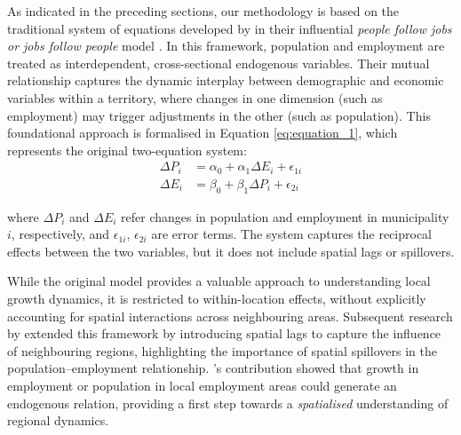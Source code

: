 \documentclass[a4paper,11pt,oneside]{article}
\begin{document}




As indicated in the preceding sections, our methodology is based on the traditional system of equations developed by \citeauthor{carlino1987determinants} in their influential \textit{people follow jobs or jobs follow people} model \citep{carlino1987determinants}. In this framework, population and employment are treated as interdependent, cross-sectional endogenous variables. Their mutual relationship captures the dynamic interplay between demographic and economic variables within a territory, where changes in one dimension (such as employment) may trigger adjustments in the other (such as population). This foundational approach is formalised in Equation \eqref{eq:equation_1}, which represents the original two-equation system:
%
\begin{equation}
\tag{i}
\label{eq:equation_1}
\begin{aligned}
\Delta P_i &= \alpha_0 + \alpha_1 \Delta E_i + \epsilon_{1i} \\
\Delta E_i &= \beta_0 + \beta_1 \Delta P_i + \epsilon_{2i}
\end{aligned}
\end{equation}


\noindent
where \( \Delta P_i \) and \( \Delta E_i \) refer changes in population and employment in municipality \( i \), respectively, and \( \epsilon_{1i} \), \( \epsilon_{2i} \) are error terms. The system captures the reciprocal effects between the two variables, but it does not include spatial lags or spillovers.


While the original model provides a valuable approach to understanding local growth dynamics, it is restricted to within-location effects, without explicitly accounting for spatial interactions across neighbouring areas. Subsequent research by \cite{boarnet1994monocentric} extended this framework by introducing spatial lags to capture the influence of neighbouring regions, highlighting the importance of spatial spillovers in the population--employment relationship. \citeauthor{boarnet1994monocentric}'s contribution showed that growth in employment or population in local employment areas could generate an endogenous relation, providing a first step towards a \textit{spatialised} understanding of regional dynamics.
\end{document}
